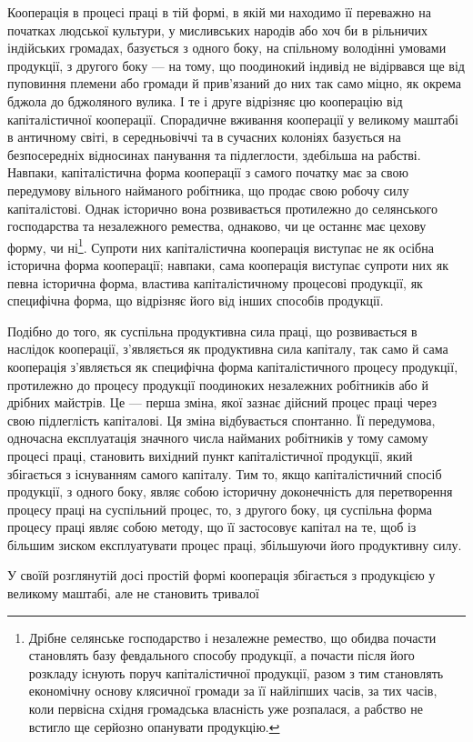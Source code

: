 Кооперація в процесі праці в тій формі, в якій ми находимо
її переважно на початках людської культури, у мисливських народів або хоч би в рільничих індійських громадах, базується
з одного боку, на спільному володінні умовами продукції, з другого
боку — на тому, що поодинокий індивід не відірвався ще від
пуповиння племени або громади й прив’язаний до них так само
міцно, як окрема бджола до бджоляного вулика. І те і друге відрізняє
цю кооперацію від капіталістичної кооперації. Спорадичне
вживання кооперації у великому маштабі в античному світі, в
середньовіччі та в сучасних колоніях базується на безпосередніх
відносинах панування та підлеглости, здебільша на рабстві.
Навпаки, капіталістична форма кооперації з самого початку має
за свою передумову вільного найманого робітника, що продає
свою робочу силу капіталістові. Однак історично вона розвивається
протилежно до селянського господарства та незалежного
ремества, однаково, чи це останнє має цехову форму, чи ні\footnote{
Дрібне селянське господарство і незалежне ремество, що обидва
почасти становлять базу февдального способу продукції, а почасти після
його розкладу існують поруч капіталістичної продукції, разом з тим становлять
економічну основу клясичної громади за її найліпших часів, за
тих часів, коли первісна східня громадська власність уже розпалася, а
рабство не встигло ще серйозно опанувати продукцію.
}.
Супроти них капіталістична кооперація виступає не як осібна
історична форма кооперації; навпаки, сама кооперація виступає
супроти них як певна історична форма, властива капіталістичному
процесові продукції, як специфічна форма, що відрізняє
його від інших способів продукції.

Подібно до того, як суспільна продуктивна сила праці, що
розвивається в наслідок кооперації, з’являється як продуктивна
сила капіталу, так само й сама кооперація з’являється як специфічна
форма капіталістичного процесу продукції, протилежно до
процесу продукції поодиноких незалежних робітників або й дрібних
майстрів. Це — перша зміна, якої зазнає дійсний процес
праці через свою підлеглість капіталові. Ця зміна відбувається
спонтанно. Її передумова, одночасна експлуатація значного
числа найманих робітників у тому самому процесі праці, становить
вихідний пункт капіталістичної продукції, який збігається
з існуванням самого капіталу. Тим то, якщо капіталістичний
спосіб продукції, з одного боку, являє собою історичну доконечність
для перетворення процесу праці на суспільний процес, то,
з другого боку, ця суспільна форма процесу праці являє собою
методу, що її застосовує капітал на те, щоб із більшим зиском
експлуатувати процес праці, збільшуючи його продуктивну силу.

У своїй розглянутій досі простій формі кооперація збігається
з продукцією у великому маштабі, але не становить тривалої
\parbreak{}  %

